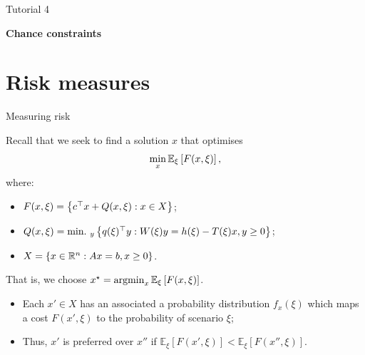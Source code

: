 \begin{frame}{Tutorial 4}

\centering
\large
\bf 
Chance constraints
	
\end{frame}


\section{Risk measures}


\begin{frame}{Measuring risk}

	Recall that we seek to find a solution $x$ that optimises
	\begin{equation*}
		\min_x	\mathbb{E}_\xi\left[ F(x, \xi) \right], 	
	\end{equation*}
	where: 
	\begin{itemize}
		\item $F(x,\xi) = \left\{ c^\top x + Q(x,\xi) : x \in X \right \}$;
		\item $Q(x, \xi) = \mathop{\text{min.} \ }_y \left\{ q(\xi)^\top y : W(\xi)y = h(\xi) - T(\xi)x, y \ge 0 \right \}$;
		\item $X=\left\{ x \in \mathbb R^n : Ax = b, x \ge 0 \right \}$.	
	\end{itemize}
	
	\pause
	That is, we choose $x^\star = \mathop{\rm argmin}_x \mathbb{E}_\xi\left[F(x,\xi)\right]	$.
	\begin{itemize}
		\item Each $x' \in X$ has an associated a \alert{probability distribution} $f_x(\xi)$ which maps a cost $F(x', \xi)$ to the probability of scenario $\xi$; 
		\item Thus, $x'$ is \alert{preferred} over $x''$ if 	$\mathbb{E}_\xi\left[F(x', \xi)\right] < \mathbb{E}_\xi\left[F(x'', \xi)\right]$.
	\end{itemize}
	
\end{frame}


